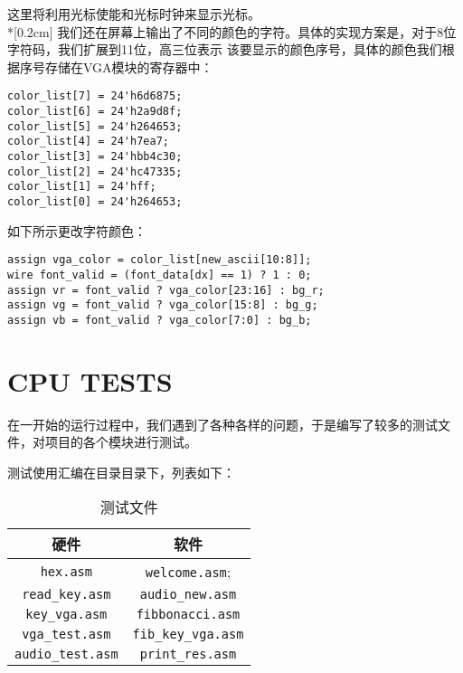 

这里将利用光标使能和光标时钟来显示光标。
\\*[0.2cm]
\kaishu
我们还在屏幕上输出了不同的颜色的字符。具体的实现方案是，对于8位字符码，我们扩展到11位，高三位表示
该要显示的颜色序号，具体的颜色我们根据序号存储在VGA模块的寄存器中：
\begin{lstlisting}[style = verilog-style, caption = {字符颜色列表}]
color_list[7] = 24'h6d6875;
color_list[6] = 24'h2a9d8f;
color_list[5] = 24'h264653;
color_list[4] = 24'h7ea7;
color_list[3] = 24'hbb4c30;
color_list[2] = 24'hc47335;
color_list[1] = 24'hff;
color_list[0] = 24'h264653;
\end{lstlisting}

如下所示更改字符颜色：
\begin{lstlisting}[style = verilog-style, caption = {控制字符颜色}]
assign vga_color = color_list[new_ascii[10:8]];
wire font_valid = (font_data[dx] == 1) ? 1 : 0;
assign vr = font_valid ? vga_color[23:16] : bg_r;
assign vg = font_valid ? vga_color[15:8] : bg_g;
assign vb = font_valid ? vga_color[7:0] : bg_b;
\end{lstlisting}
\section{\textsc{CPU TESTS}}
\songti
\hspace*{9mm}在一开始的运行过程中，我们遇到了各种各样的问题，于是编写了较多的测试文件，对项目的各个模块进行测试。

测试使用汇编在目录目录下，列表如下：

\begin{table}[htbp]
	\centering
	\caption{测试文件}
	\renewcommand\arraystretch{1.5}
	\kaishu
	\begin{tabular}{cc}  
		\toprule[1pt]  
		\rowcolor[gray]{0.9}   硬件 & 软件\\  
		\midrule  
		\texttt{hex.asm} & \texttt{welcome.asm};\\
		\texttt{read\_key.asm} & \texttt{audio\_new.asm}\\
		\texttt{key\_vga.asm} & \texttt{fibbonacci.asm}\\
		\texttt{vga\_test.asm} & \texttt{fib\_key\_vga.asm}\\
		\texttt{audio\_test.asm} & \texttt{print\_res.asm}\\
		\bottomrule[1pt]  
		\end{tabular} 
\end{table}
